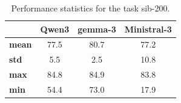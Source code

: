 \setlength{\tabcolsep}{4.5pt}
\begin{table}[ht]
    \centering\footnotesize
    \begin{tabularx}{\columnwidth}{X | c  c c}
        \toprule
         & \textbf{Qwen3} & \textbf{gemma-3} & \textbf{Ministral-3} \\
        \midrule
        \textbf{mean} & 77.5 & 80.7 & 77.2 \\
        \textbf{std} & 5.5 & 2.5 & 10.8 \\
        \textbf{max} & 84.8 & 84.9 & 83.8 \\
        \textbf{min} & 54.4 & 73.0 & 17.9 \\
        \bottomrule
    \end{tabularx}
    \caption{Performance statistics for the task sib-200.}
    \label{tab:performanceTasksib-200}
\end{table}